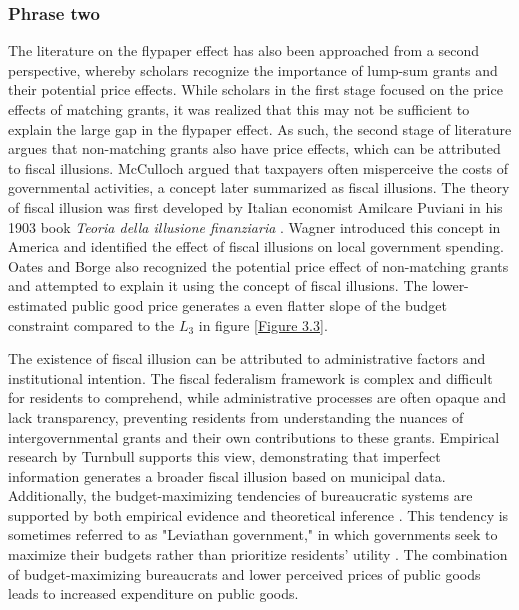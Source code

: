 \subsubsection{Phrase two}
The literature on the flypaper effect has also been approached from a second perspective, whereby scholars recognize the importance of lump-sum grants and their potential price effects. While scholars in the first stage focused on the price effects of matching grants, it was realized that this may not be sufficient to explain the large gap in the flypaper effect. As such, the second stage of literature argues that non-matching grants also have price effects, which can be attributed to fiscal illusions. McCulloch \cite{mcculloch1845treatise} argued that taxpayers often misperceive the costs of governmental activities, a concept later summarized as fiscal illusions. The theory of fiscal illusion was first developed by Italian economist Amilcare Puviani in his 1903 book \textit{Teoria della illusione finanziaria} \cite{puviani1903teoria}. Wagner  \cite{wagner1976revenue} introduced this concept in America and identified the effect of fiscal illusions on local government spending. Oates and Borge \cite{oates1979lump,borge1995lump} also recognized the potential price effect of non-matching grants and attempted to explain it using the concept of fiscal illusions. The lower-estimated public good price generates a even flatter slope of the budget constraint compared to the $L_3$ in figure \ref{Figure 3.3}.

The existence of fiscal illusion can be attributed to administrative factors and institutional intention. The fiscal federalism framework is complex and difficult for residents to comprehend, while administrative processes are often opaque and lack transparency, preventing residents from understanding the nuances of intergovernmental grants and their own contributions to these grants. Empirical research by Turnbull \cite{turnbull1998overspending} supports this view, demonstrating that imperfect information generates a broader fiscal illusion based on municipal data. Additionally, the budget-maximizing tendencies of bureaucratic systems are supported by both empirical evidence and theoretical inference \cite{mueller2003public,brennan1977towards}. This tendency is sometimes referred to as "Leviathan government," in which governments seek to maximize their budgets rather than prioritize residents' utility \cite{quigley1986budget}. The combination of budget-maximizing bureaucrats and lower perceived prices of public goods leads to increased expenditure on public goods.


